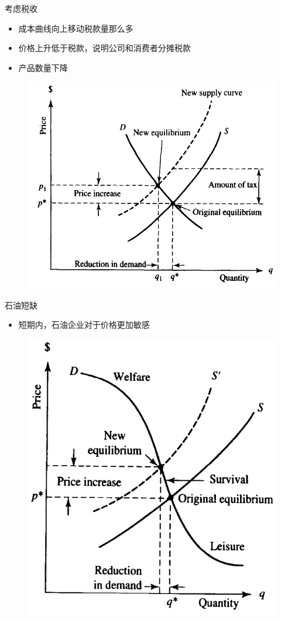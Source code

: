 \documentclass[UTF8]{ctexbeamer}
\begin{document}
\begin{frame}{考虑税收}
  \begin{itemize}
  \item 成本曲线向上移动税款量那么多
  \item 价格上升低于税款，说明公司和消费者分摊税款
  \item 产品数量下降
  \end{itemize}

  \begin{figure}
    \centering
    \includegraphics[width=.5\textwidth]{tax.png}
  \end{figure}
  
\end{frame}

\begin{frame}{石油短缺}
  \begin{itemize}
  \item 短期内，石油企业对于价格更加敏感
  \end{itemize}

  \begin{figure}
    \centering
    \includegraphics[width=.5\textwidth]{oo.png}
  \end{figure}

\end{frame}
\end{document}
